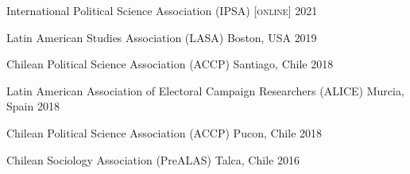 





\vspace{1mm}

\begin{cvhonors}
\cvconf
{International Political Science Association (IPSA)} 
{\scshape [online]}
{2021}
\end{cvhonors}

\begin{cvhonors}
\cvconf
{Latin American Studies Association (LASA)} 
{Boston, USA}
{2019}
\end{cvhonors}

\begin{cvhonors}
\cvconf
{Chilean Political Science Association (ACCP)} 
{Santiago, Chile}
{2018}
\end{cvhonors}

\begin{cvhonors}
\cvconf
{Latin American Association of Electoral Campaign Researchers (ALICE)} 
{Murcia, Spain}
{2018}
\end{cvhonors}

\begin{cvhonors}
\cvconf
{Chilean Political Science Association (ACCP)} 
{Pucon, Chile}
{2018}
\end{cvhonors}


\begin{cvhonors}
\cvconf
{Chilean Sociology Association (PreALAS)} 
{Talca, Chile}
{2016}
\end{cvhonors}

